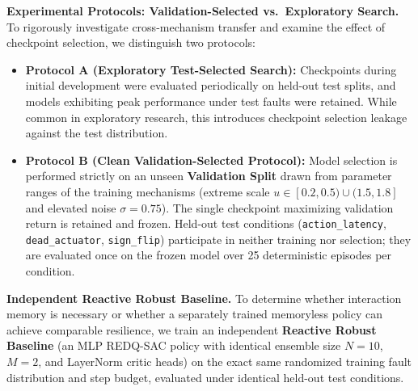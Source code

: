 \documentclass[conference]{IEEEtran}
\begin{document}
\textbf{Experimental Protocols: Validation-Selected vs.\ Exploratory Search.}
To rigorously investigate cross-mechanism transfer and examine the effect of checkpoint selection, we distinguish two protocols:
\begin{itemize}
    \item \textbf{Protocol A (Exploratory Test-Selected Search):} Checkpoints during initial development were evaluated periodically on held-out test splits, and models exhibiting peak performance under test faults were retained. While common in exploratory research, this introduces checkpoint selection leakage against the test distribution.
    \item \textbf{Protocol B (Clean Validation-Selected Protocol):} Model selection is performed strictly on an unseen \textbf{Validation Split} drawn from parameter ranges of the training mechanisms (extreme scale $u \in [0.2, 0.5) \cup (1.5, 1.8]$ and elevated noise $\sigma = 0.75$). The single checkpoint maximizing validation return is retained and frozen. Held-out test conditions (\texttt{action\_latency}, \texttt{dead\_actuator}, \texttt{sign\_flip}) participate in neither training nor selection; they are evaluated once on the frozen model over 25 deterministic episodes per condition.
\end{itemize}

\textbf{Independent Reactive Robust Baseline.}
To determine whether interaction memory is necessary or whether a separately trained memoryless policy can achieve comparable resilience, we train an independent \textbf{Reactive Robust Baseline} (an MLP REDQ-SAC policy with identical ensemble size $N=10$, $M=2$, and LayerNorm critic heads) on the exact same randomized training fault distribution and step budget, evaluated under identical held-out test conditions.
\end{document}
